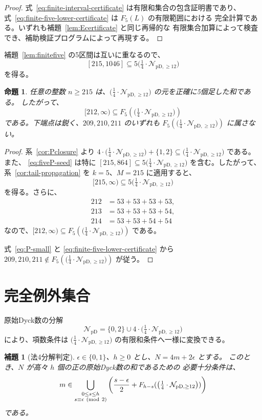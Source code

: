 \documentclass[12pt]{ltjsarticle}
\theoremstyle{plain}
\newtheorem{proposition}[theorem]{命題}
\newtheorem{lemma}[theorem]{補題}
\theoremstyle{definition}
\theoremstyle{plain}
\newcommand{\NpD}{\mathcal{N}_{\mathrm{pD}}}
\newcommand{\Pset}{%
  \bigl(\tfrac{1}{4}\cdot\mathcal{N}_{\mathrm{pD},\geq 12}\bigr)%
}
\begin{document}
\begin{proof}
式~\eqref{eq:finite-interval-certificate} は有限和集合の包含証明書であり、
式~\eqref{eq:finite-five-lower-certificate} は $F_5(L)$ の有限範囲における
完全計算である。いずれも補題~\ref{lem:Ecertificate} と同じ再帰的な
有限集合加算によって検査でき、補助検証プログラムによって再現する。
\end{proof}

補題~\ref{lem:finitefive} の5区間は互いに重なるので、
\begin{equation}\label{eq:fiveP-seed}
 [215,1046]\subseteq5\Pset
\end{equation}
を得る。

\begin{proposition}\label{prop:fiveP}
任意の整数 $n\geq215$ は、$\Pset$ の元を正確に5個足した和である。
したがって、
\[
 [212,\infty)\subseteq F_5(\Pset)
\]
である。下端点は鋭く、$209,210,211$ のいずれも
$F_5(\Pset)$ に属さない。
\end{proposition}

\begin{proof}
系~\ref{cor:Pclosure} より
$4\cdot\Pset+\{1,2\}\subseteq\Pset$ である。また、
\eqref{eq:fiveP-seed} は特に
$[215,864]\subseteq5\Pset$ を含む。したがって、
系~\ref{cor:tail-propagation} を $k=5$、$M=215$ に適用すると、
\[
 [215,\infty)\subseteq5\Pset
\]
を得る。さらに、
\[
\begin{aligned}
212&=53+53+53+53,\\
213&=53+53+53+54,\\
214&=53+53+54+54
\end{aligned}
\]
なので、$[212,\infty)\subseteq F_5(\Pset)$ である。

式~\eqref{eq:P-small} と \eqref{eq:finite-five-lower-certificate} から
$209,210,211\notin F_5(\Pset)$ が従う。
\end{proof}

\section{完全例外集合}\label{sec:exceptions}

原始Dyck数の分解
\[
 \NpD=\{0,2\}\cup4\cdot\Pset
\]
により、項数条件は $\Pset$ の有限和条件へ一様に変換できる。

\begin{lemma}[法4分解判定]\label{lem:mod4-sumcriterion}
$\epsilon\in\{0,1\}$、$h\geq0$ とし、$N=4m+2\epsilon$ とする。
このとき、$N$ が高々 $h$ 個の正の原始Dyck数の和であるための
必要十分条件は、
\begin{equation}\label{eq:mod4-sumcriterion}
 m\in
 \bigcup_{\substack{0\leq s\leq h\\ s\equiv\epsilon\ ({\rm mod}\ 2)}}
 \left(\frac{s-\epsilon}{2}+F_{h-s}(\Pset)\right)
\end{equation}
である。
\end{lemma}
\end{document}
